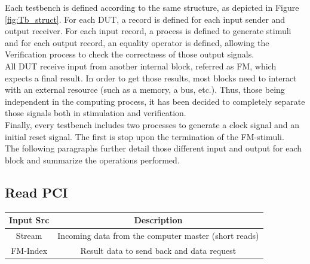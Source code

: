 Each testbench is defined according to the same structure, as depicted in Figure \ref{fig:Tb_struct}. For each DUT, a record is defined for each input sender and output receiver. For each input record, a process is defined to generate stimuli and for each output record, an equality operator is defined, allowing the \textrm{Verification} process to check the correctness of those output signals. \\
All DUT receive input from another internal block, referred as FM, which expects a final result. In order to get those results, most blocks need to interact with an external resource (such as a memory, a bus, etc.). Thus, those being independent in the computing process, it has been decided to completely separate those signals both in stimulation and verification. \\

Finally, every testbench includes two processes to generate a clock signal and an initial reset signal. The first is stop upon the termination of the FM-stimuli. \\

The following paragraphs further detail those different input and output for each block and summarize the operations performed.


\subsection{Read PCI}
\vspace*{3mm}
\begin{center}
    \begin{tabular}{|c|c|}
\hline
  Input Src   &  Description \\
  \hline
   Stream  & Incoming data from the computer master (short reads) \\
   FM-Index & Result data to send back and data request \\
   \hline
\end{tabular}
\end{center}
\vspace*{5mm}

